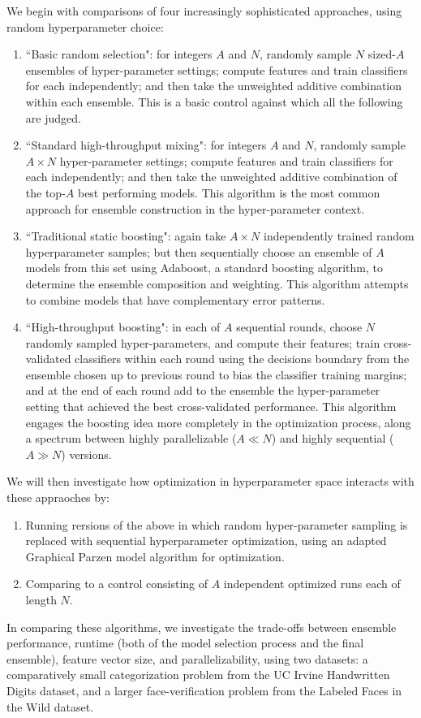 \documentclass[11pt,twocolumn]{article}
\begin{document}
We begin with comparisons of four increasingly sophisticated approaches, using random hyperparameter choice: 
\begin{enumerate}
\item ``Basic random selection":  for integers $A$ and $N$, randomly sample $N$ sized-$A$ ensembles of hyper-parameter settings; compute features and train classifiers for each independently; and then take the unweighted additive combination within each ensemble.  This is a basic control against which all the following are judged. 
\item ``Standard high-throughput mixing":  for integers $A$ and $N$, randomly sample $A \times N$ hyper-parameter settings; compute features and train classifiers for each independently; and then take the unweighted additive combination of the top-$A$ best performing models.  This algorithm is the most common approach for ensemble construction in the hyper-parameter context. 
\item ``Traditional static boosting":  again take $A \times N$ independently trained random hyperparameter samples; but then sequentially choose an ensemble of $A$ models from this set using Adaboost, a standard boosting algorithm, to determine the ensemble composition and weighting.   This algorithm attempts to combine models that have complementary error patterns.  
\item ``High-throughput boosting":  in each of $A$ sequential rounds, choose $N$ randomly sampled hyper-parameters, and compute their features; train cross-validated classifiers within each round using the decisions boundary from the ensemble chosen up to previous round to bias the classifier training margins; and at the end of each round add to the ensemble the hyper-parameter setting that achieved the best cross-validated performance.   This algorithm engages the boosting idea more completely in the optimization process, along a spectrum between highly parallelizable ($A \ll N$) and highly sequential ($A \gg N$) versions.
\end{enumerate}

We will then investigate how optimization in hyperparameter space interacts with these appraoches by:
\begin{enumerate}
\item Running rersions of the above in which random hyper-parameter sampling is replaced with sequential hyperparameter optimization, using an adapted Graphical Parzen model algorithm for optimization.   
\item Comparing to a control consisting of $A$ independent optimized runs each of length $N$.
\end{enumerate}

In comparing these algorithms, we investigate the trade-offs between ensemble performance, runtime (both of the model selection process and the final ensemble), feature vector size, and parallelizability, using two datasets:  a comparatively small categorization problem from the UC Irvine Handwritten Digits dataset, and a larger face-verification problem from the Labeled Faces in the Wild dataset. 
\end{document}

